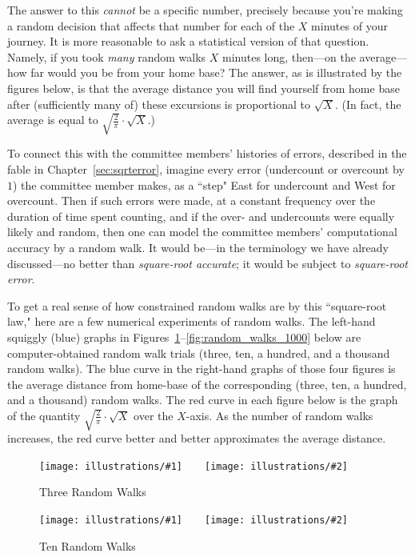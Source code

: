 \documentclass[openany]{book}
\newcommand{\illtwo}[4]{%
   \begin{figure}[H]\centering%
   \texttt{[image: illustrations/\#1]}$\qquad$\texttt{[image: illustrations/\#2]}%
   \caption{#4}%
    \end{figure}}
\theoremstyle{plain}
\theoremstyle{definition}
\begin{document}
  The answer to this {\it cannot} be a specific number, precisely because you're making a random decision that affects that number for each of the $X$ minutes of your journey. It is more reasonable to ask a statistical version of that question. Namely, if you took {\it many} random walks $X$ minutes long, then---on the average---how far would you be from your home base?  The answer, as is illustrated by the figures below, is that the average distance you will find yourself from home base after (sufficiently many of) these excursions is proportional to ${\sqrt X}$. (In fact, the average is equal to $\sqrt{\frac{2}{\pi}}\cdot {\sqrt X}$.)

  To connect this with the committee members' histories of errors, described in the fable in Chapter~\ref{sec:sqrterror}, imagine  every  error (undercount or overcount by $1$) the committee member makes, as a ``step" East for undercount and West for overcount. Then if such errors were made, at a constant frequency over the duration of time spent counting, and if the over- and undercounts were equally likely and random, then one can model the committee members' computational  accuracy by a random walk. It would be---in the terminology we have already discussed---no better than {\it square-root accurate}; it would be subject to {\it square-root error}.

   To get a real sense of how constrained random walks are by this ``square-root law," here are a few numerical experiments of random walks. The left-hand squiggly (blue) graphs in Figures~\ref{fig:random_walks_3}--\ref{fig:random_walks_1000} below are computer-obtained random walk trials (three, ten, a hundred, and a thousand random walks). The blue curve in the right-hand graphs of those four figures is the average distance from home-base of the corresponding (three, ten, a hundred, and a thousand) random walks.
The red curve in each figure below is the graph of the quantity $\sqrt{\frac{2}{\pi}}\cdot {\sqrt X}$ over the $X$-axis.
As the number of random walks increases, the red curve
better and better approximates the average distance.

\illtwo{random_walks-3}{random_walks-3-mean}{.45}{Three Random Walks\label{fig:random_walks_3}}

\illtwo{random_walks-10}{random_walks-10-mean}{.45}{Ten Random Walk\index{random walk}s\label{fig:random_walks_10}}
\end{document}
